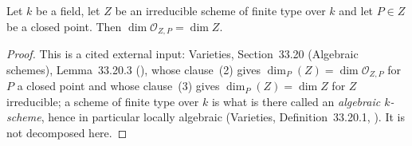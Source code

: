 \begin{lemma}
\label{lem:pcb-local-ring-dimension}
Let \(k\) be a field, let \(Z\) be an irreducible scheme of finite type
over \(k\) and let \(P\in Z\) be a closed point.  Then
\(\dim\mathcal O_{Z,P}=\dim Z\).
\end{lemma}
\begin{proof}
This is a cited external input: Varieties, Section~33.20 (Algebraic
schemes), Lemma~33.20.3 (), whose clause~(2) gives
\(\dim_P(Z)=\dim\mathcal O_{Z,P}\) for \(P\) a closed point and whose
clause~(3) gives \(\dim_P(Z)=\dim Z\) for \(Z\) irreducible; a scheme of
finite type over \(k\) is what is there called an \emph{algebraic
\(k\)-scheme}, hence in particular locally algebraic (Varieties,
Definition~33.20.1, ).  It is not decomposed here.
\end{proof}

